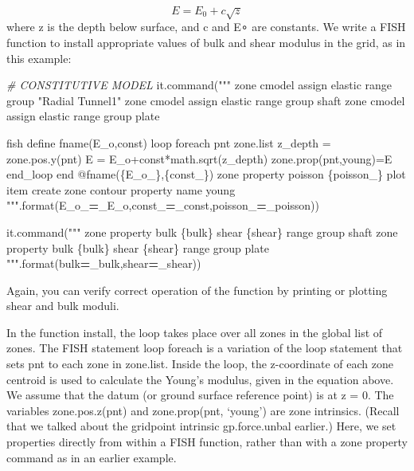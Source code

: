 \documentclass[a4paper, nobind]{templates/ociamthesis}
\newenvironment{Shaded}{\begin{snugshade}}{\end{snugshade}}
\newcommand{\BuiltInTok}[1]{#1}
\newcommand{\CommentTok}[1]{\textcolor[rgb]{0.56,0.35,0.01}{\textit{#1}}}
\newcommand{\NormalTok}[1]{#1}
\newcommand{\OperatorTok}[1]{\textcolor[rgb]{0.81,0.36,0.00}{\textbf{#1}}}
\newcommand{\SpecialCharTok}[1]{\textcolor[rgb]{0.00,0.00,0.00}{#1}}
\newcommand{\StringTok}[1]{\textcolor[rgb]{0.31,0.60,0.02}{#1}}
\renewenvironment{Shaded}
{
  \vspace{10pt}%
  \begin{snugshade}%
}{%
  \end{snugshade}%
  \vspace{8pt}%
}
\begin{document}
\[ E = E_0 + c \sqrt{z}  \] where z is the depth below surface, and c
and E∘ are constants. We write a FISH function to install appropriate
values of bulk and shear modulus in the grid, as in this example:

\begin{Shaded}
\begin{Highlighting}[]
\CommentTok{\# CONSTITUTIVE MODEL}
\NormalTok{it.command(}\StringTok{"""}
\StringTok{zone cmodel assign elastic range group "Radial Tunnel1"}
\StringTok{zone cmodel assign elastic range group \textquotesingle{}shaft\textquotesingle{}}
\StringTok{zone cmodel assign elastic range group \textquotesingle{}plate\textquotesingle{}}

\StringTok{fish define fname(E\_o,const)}
\StringTok{loop foreach pnt zone.list}
\StringTok{z\_depth = zone.pos.y(pnt)}
\StringTok{E = E\_o+const*math.sqrt(z\_depth)}
\StringTok{zone.prop(pnt,\textquotesingle{}young\textquotesingle{})=E}
\StringTok{end\_loop}
\StringTok{end}
\StringTok{@fname(}\SpecialCharTok{\{E\_o\_\}}\StringTok{,}\SpecialCharTok{\{const\_\}}\StringTok{)}
\StringTok{zone property poisson }\SpecialCharTok{\{poisson\_\}}
\StringTok{plot item create zone contour property name \textquotesingle{}young\textquotesingle{}}
\StringTok{"""}\NormalTok{.}\BuiltInTok{format}\NormalTok{(E\_o\_}\OperatorTok{=}\NormalTok{\_E\_o,const\_}\OperatorTok{=}\NormalTok{\_const,poisson\_}\OperatorTok{=}\NormalTok{\_poisson))}

\NormalTok{it.command(}\StringTok{"""}
\StringTok{zone property bulk }\SpecialCharTok{\{bulk\}}\StringTok{  shear }\SpecialCharTok{\{shear\}}\StringTok{ range group \textquotesingle{}shaft\textquotesingle{}}
\StringTok{zone property bulk }\SpecialCharTok{\{bulk\}}\StringTok{  shear }\SpecialCharTok{\{shear\}}\StringTok{ range group \textquotesingle{}plate\textquotesingle{}}
\StringTok{"""}\NormalTok{.}\BuiltInTok{format}\NormalTok{(bulk}\OperatorTok{=}\NormalTok{\_bulk,shear}\OperatorTok{=}\NormalTok{\_shear))}
\end{Highlighting}
\end{Shaded}

Again, you can verify correct operation of the function by printing or
plotting shear and bulk moduli.

In the function install, the loop takes place over all zones in the
global list of zones. The FISH statement loop foreach is a variation of
the loop statement that sets pnt to each zone in zone.list. Inside the
loop, the z-coordinate of each zone centroid is used to calculate the
Young's modulus, given in the equation above. We assume that the datum
(or ground surface reference point) is at z = 0. The variables
zone.pos.z(pnt) and zone.prop(pnt, `young') are zone intrinsics. (Recall
that we talked about the gridpoint intrinsic gp.force.unbal earlier.)
Here, we set properties directly from within a FISH function, rather
than with a zone property command as in an earlier example.
\end{document}
